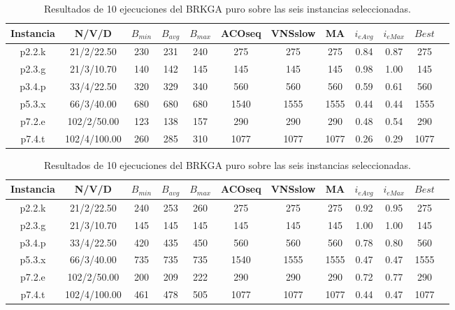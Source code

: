 

\bigskip

\begin{table}[H]
\begin{center}
\begin{tabular}{ |c|c|c|c|c|c|c|c|c|c|c|c| } 
\hline
Instancia & N/V/D & $B_{min}$ & $B_{avg}$ & $B_{max}$ & ACOseq & VNSslow & MA & $i_{eAvg}$ & $i_{eMax}$ & $Best$ \\
\hline
p2.2.k & 21/2/22.50 & 230 & 231 & 240 & 275 & 275 & 275 & 0.84 & 0.87 & 275  \\
p2.3.g & 21/3/10.70 & 140 & 142 & 145 & 145 & 145 & 145 & 0.98 & 1.00 & 145 \\
p3.4.p & 33/4/22.50 & 320 & 329 & 340 & 560 & 560 & 560 & 0.59 & 0.61 & 560 \\
p5.3.x & 66/3/40.00 & 680 & 680 & 680 & 1540 & 1555 & 1555 & 0.44 & 0.44 & 1555 \\
p7.2.e & 102/2/50.00 & 123 & 138 & 157 & 290 & 290 & 290 & 0.48 & 0.54 & 290 \\
p7.4.t & 102/4/100.00 & 260 & 285 & 310 & 1077 & 1077 & 1077 & 0.26 & 0.29 & 1077 \\
\hline
\end{tabular}
\end{center}
\caption{Resultados de 10 ejecuciones del BRKGA puro sobre las seis instancias seleccionadas.}
\label{tab:resultadosBrkgaPuro}
\end{table}


\bigskip

\begin{table}[H]
\begin{center}
\begin{tabular}{ |c|c|c|c|c|c|c|c|c|c|c|c| } 
\hline
Instancia & N/V/D & $B_{min}$ & $B_{avg}$ & $B_{max}$ & ACOseq & VNSslow & MA & $i_{eAvg}$ & $i_{eMax}$ & $Best$ \\
\hline
p2.2.k & 21/2/22.50 & 240 & 253 & 260 & 275 & 275 & 275 & 0.92 & 0.95 & 275   \\
p2.3.g & 21/3/10.70 & 145 & 145 & 145 & 145 & 145 & 145 & 1.00 & 1.00 & 145   \\
p3.4.p & 33/4/22.50 & 420 & 435 & 450 & 560 & 560 & 560 & 0.78 & 0.80 & 560   \\
p5.3.x & 66/3/40.00 & 735 & 735 & 735 & 1540 & 1555 & 1555 & 0.47 & 0.47 & 1555   \\
p7.2.e & 102/2/50.00 & 200 & 209 & 222 & 290 & 290 & 290 & 0.72 & 0.77 & 290   \\
p7.4.t & 102/4/100.00 & 461 & 478 & 505 & 1077 & 1077 & 1077 & 0.44 & 0.47 & 1077   \\
\hline
\end{tabular}
\end{center}
\caption{Resultados de 10 ejecuciones del BRKGA puro sobre las seis instancias seleccionadas.}
\label{tab:resultadosBrkgaPuro}
\end{table}


